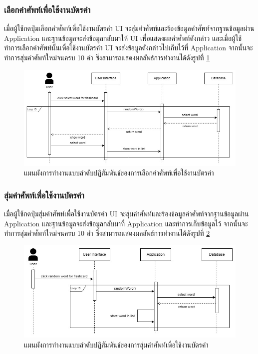\documentclass[12pt,oneside,openright,a4paper]{cpe-thai-project}
\begin{document}
\pagebreak
\subsubsection{เลือกคำศัพท์เพื่อใช้งานบัตรคำ}
\hspace{1cm}
เมื่อผู้ใช้กดปุ่มเลือกคำศัพท์เพื่อใช้งานบัตรคำ UI จะสุ่มคำศัพท์และร้องข้อมูลคำศัพท์จากฐานข้อมูลผ่าน Application
และฐานข้อมูลจะส่งข้อมูลกลับมาให้ UI เพื่อแสดงผลคำศัพท์ดังกล่าว และเมื่อผู้ใช้ทำการเลือกคำศัพท์นั้นเพื่อใช้งานบัตรคำ
UI จะส่งข้อมูลดังกล่าวไปเก็บไว้ที่ Application จากนั้นจะทำการสุ่มคำศัพท์ใหม่จนครบ 10 คำ ซึ่งสามารถแสดงผลลัพธ์การทำงานได้ดังรูปที่ \ref{fig:S_SelectFlashcard}
\begin{figure}[!h]\centering
	\includegraphics[width=\textwidth, keepaspectratio=true]{image/chap3/sequence/Flash-Select.jpg}
	\caption{แผนผังการทำงานแบบลำดับปฏิสัมพันธ์ของการเลือกคำศัพท์เพื่อใช้งานบัตรคำ}\label{fig:S_SelectFlashcard}
\end{figure}

\subsubsection{สุ่มคำศัพท์เพื่อใช้งานบัตรคำ}
\hspace{1cm}
เมื่อผู้ใช้กดปุ่มสุ่มคำศัพท์เพื่อใช้งานบัตรคำ UI จะสุ่มคำศัพท์และร้องข้อมูลคำศัพท์จากฐานข้อมูลผ่าน Application
และฐานข้อมูลจะส่งข้อมูลกลับมาที่ Application และทำการเก็บข้อมูลไว้ จากนั้นจะทำการสุ่มคำศัพท์ใหม่จนครบ 10 คำ
ซึ่งสามารถแสดงผลลัพธ์การทำงานได้ดังรูปที่ \ref{fig:S_RandomFlashcard}
\begin{figure}[!h]\centering
	\includegraphics[width=\textwidth, keepaspectratio=true]{image/chap3/sequence/Flash-Random.jpg}
	\caption{แผนผังการทำงานแบบลำดับปฏิสัมพันธ์ของการสุ่มคำศัพท์เพื่อใช้งานบัตรคำ}\label{fig:S_RandomFlashcard}
\end{figure}
\end{document}
